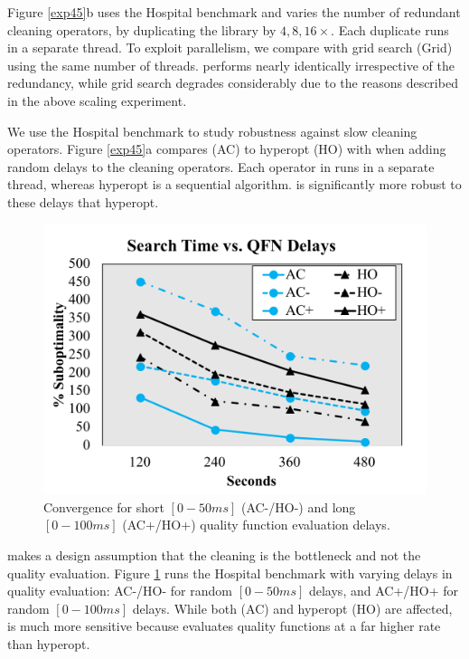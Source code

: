  Figure \ref{exp45}b uses the Hospital benchmark and varies the number of redundant cleaning operators, by duplicating the library by $4, 8, 16\times$.  Each duplicate runs in a separate thread.  To exploit parallelism, we compare with grid search (Grid) using the same number of threads.  \sys performs nearly identically irrespective of the redundancy, while grid search degrades considerably due to the reasons described in the above scaling experiment.  


We use the Hospital benchmark to study robustness against slow cleaning operators. Figure \ref{exp45}a compares \sys (AC) to hyperopt (HO) with when adding random delays to the cleaning operators.  Each operator in \sys runs in a separate thread, whereas hyperopt is a sequential algorithm.  \sys is significantly more robust to these delays that hyperopt.

\begin{figure}[h]
\centering
 \includegraphics[width=0.8\columnwidth]{exp/exp6.png}
 \caption{Convergence for short $[0-50ms]$ (AC-/HO-) and long $[0-100ms]$ (AC+/HO+) quality function evaluation delays.  \label{exp6}}
\end{figure}


\sys makes a design assumption that the cleaning is the bottleneck and not the quality evaluation. Figure \ref{exp6} runs the Hospital benchmark with varying delays in quality evaluation: AC-/HO- for random $[0-50ms]$ delays, and AC+/HO+ for random $[0-100ms]$ delays. While both \sys (AC) and hyperopt (HO) are affected, \sys is much more sensitive because \sys evaluates quality functions at a far higher rate than hyperopt.




